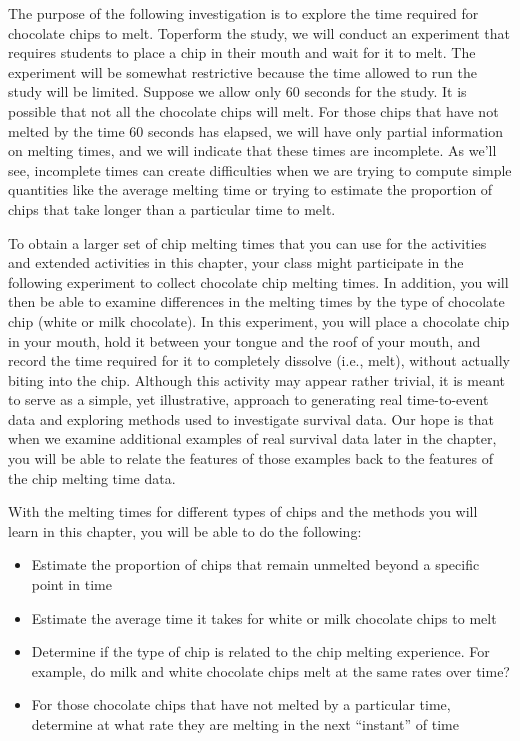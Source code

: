 \documentclass[
]{book}
\providecommand{\tightlist}{%
  \setlength{\itemsep}{0pt}\setlength{\parskip}{0pt}}
\begin{document}
The purpose of the following investigation is to explore the time required for chocolate chips to melt. Toperform the study, we will conduct an experiment that requires students to place a chip in their mouth and wait for it to melt. The experiment will be somewhat restrictive because the time allowed to run the study will be limited. Suppose we allow only 60 seconds for the study. It is possible that not all the chocolate chips will melt. For those chips that have not melted by the time 60 seconds has elapsed, we will have only partial
information on melting times, and we will indicate that these times are incomplete. As we'll see, incomplete times can create difficulties when we are trying to compute simple quantities like the average melting time or trying to estimate the proportion of chips that take longer than a particular time to melt.

To obtain a larger set of chip melting times that you can use for the activities and extended activities in this chapter, your class might participate in the following experiment to collect chocolate chip melting times. In addition, you will then be able to examine differences in the melting times by the type of chocolate
chip (white or milk chocolate). In this experiment, you will place a chocolate chip in your mouth, hold it between your tongue and the roof of your mouth, and record the time required for it to completely dissolve (i.e., melt), without actually biting into the chip. Although this activity may appear rather trivial, it is meant to serve as a simple, yet illustrative, approach to generating real time-to-event data and exploring methods used to investigate survival data. Our hope is that when we examine additional examples of real survival data
later in the chapter, you will be able to relate the features of those examples back to the features of the chip
melting time data.

With the melting times for different types of chips and the methods you will learn in this chapter, you will be able to do the following:

\begin{itemize}
\tightlist
\item
  Estimate the proportion of chips that remain unmelted beyond a specific point in time\\
\item
  Estimate the average time it takes for white or milk chocolate chips to melt\\
\item
  Determine if the type of chip is related to the chip melting experience. For example, do milk and white chocolate chips melt at the same rates over time?\\
\item
  For those chocolate chips that have not melted by a particular time, determine at what rate they are melting in the next ``instant'' of time
\end{itemize}
\end{document}
